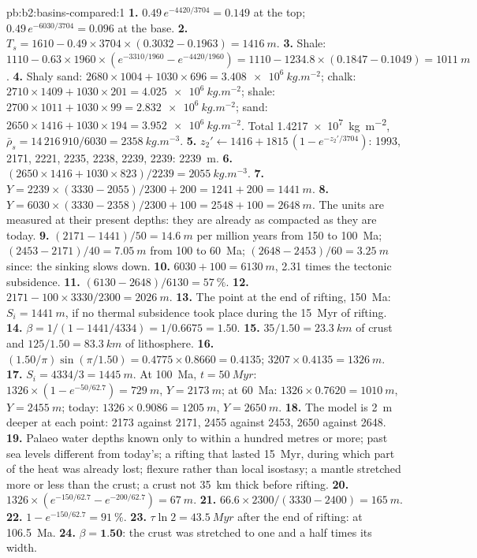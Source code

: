 \begin{solution}{pb:b2:basins-compared:1}
\textbf{1.} $0.49\,e^{-4420/3704} = 0.149$ at the top; $0.49\,e^{-6030/3704} = 0.096$ at the base.
\textbf{2.} $T_s = 1610 - 0.49\times3704\times(0.3032 - 0.1963) = \qty{1416}{m}$.
\textbf{3.} Shale: $1110 - 0.63\times1960\times(e^{-3310/1960} - e^{-4420/1960}) = 1110 - 1234.8
\times(0.1847 - 0.1049) = \qty{1011}{m}$.
\textbf{4.} Shaly sand: $2680\times1004 + 1030\times696 = \qty{3.408e6}{kg.m^{-2}}$; chalk:
$2710\times1409 + 1030\times201 = \qty{4.025e6}{kg.m^{-2}}$; shale: $2700\times1011 + 1030\times99 =
\qty{2.832e6}{kg.m^{-2}}$; sand: $2650\times1416 + 1030\times194 = \qty{3.952e6}{kg.m^{-2}}$. Total
\qty{1.4217e7}{kg.m^{-2}}, $\bar\rho_s = 14\,216\,910/6030 = \qty{2358}{kg.m^{-3}}$.
\textbf{5.} $z_2' \leftarrow 1416 + 1815\,(1 - e^{-z_2'/3704})$: 1993, 2171, 2221, 2235, 2238, 2239,
2239: \qty{2239}{m}.
\textbf{6.} $(2650\times1416 + 1030\times823)/2239 = \qty{2055}{kg.m^{-3}}$.
\textbf{7.} $Y = 2239\times(3330 - 2055)/2300 + 200 = 1241 + 200 = \qty{1441}{m}$.
\textbf{8.} $Y = 6030\times(3330 - 2358)/2300 + 100 = 2548 + 100 = \qty{2648}{m}$. The units are
measured at their present depths: they are already as compacted as they are today.
\textbf{9.} $(2171 - 1441)/50 = \qty{14.6}{m}$ per million years from 150 to \qty{100}{Ma};
$(2453 - 2171)/40 = \qty{7.05}{m}$ from 100 to \qty{60}{Ma}; $(2648 - 2453)/60 = \qty{3.25}{m}$
since: the sinking slows down.
\textbf{10.} $6030 + 100 = \qty{6130}{m}$, 2.31 times the tectonic subsidence.
\textbf{11.} $(6130 - 2648)/6130 = \qty{57}{\percent}$.
\textbf{12.} $2171 - 100\times3330/2300 = \qty{2026}{m}$.
\textbf{13.} The point at the end of rifting, \qty{150}{Ma}: $S_i = \qty{1441}{m}$, if no thermal
subsidence took place during the \qty{15}{Myr} of rifting.
\textbf{14.} $\beta = 1/(1 - 1441/4334) = 1/0.6675 = 1.50$.
\textbf{15.} $35/1.50 = \qty{23.3}{km}$ of crust and $125/1.50 = \qty{83.3}{km}$ of lithosphere.
\textbf{16.} $(1.50/\pi)\sin(\pi/1.50) = 0.4775\times0.8660 = 0.4135$; $3207\times0.4135 =
\qty{1326}{m}$.
\textbf{17.} $S_i = 4334/3 = \qty{1445}{m}$. At \qty{100}{Ma}, $t = \qty{50}{Myr}$: $1326\times(1 -
e^{-50/62.7}) = \qty{729}{m}$, $Y = \qty{2173}{m}$; at \qty{60}{Ma}: $1326\times0.7620 =
\qty{1010}{m}$, $Y = \qty{2455}{m}$; today: $1326\times0.9086 = \qty{1205}{m}$, $Y = \qty{2650}{m}$.
\textbf{18.} The model is \qty{2}{m} deeper at each point: 2173 against 2171, 2455 against 2453,
2650 against 2648.
\textbf{19.} Palaeo water depths known only to within a hundred metres or more; past sea levels
different from today's; a rifting that lasted \qty{15}{Myr}, during which part of the heat was
already lost; flexure rather than local isostasy; a mantle stretched more or less than the crust;
a crust not \qty{35}{km} thick before rifting.
\textbf{20.} $1326\times(e^{-150/62.7} - e^{-200/62.7}) = \qty{67}{m}$.
\textbf{21.} $66.6\times2300/(3330 - 2400) = \qty{165}{m}$.
\textbf{22.} $1 - e^{-150/62.7} = \qty{91}{\percent}$.
\textbf{23.} $\tau\ln2 = \qty{43.5}{Myr}$ after the end of rifting: at \qty{106.5}{Ma}.
\textbf{24.} $\beta = \textbf{1.50}$: the crust was stretched to one and a half times its width.
\end{solution}
